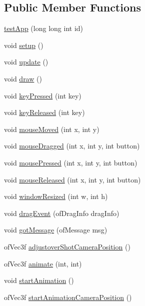 \subsection*{Public Member Functions}
\begin{DoxyCompactItemize}
\item 
\hyperlink{classtest_app_a3d796120bccff4106a3ec028b9a81912}{test\-App} (long long int id)
\item 
void \hyperlink{classtest_app_ad431db15b6150b965cd52bcba8e16e11}{setup} ()
\item 
void \hyperlink{classtest_app_afb39d201aec71a295b7609876bf7d0c6}{update} ()
\item 
void \hyperlink{classtest_app_af869cba67b1dab8481f8d0e216d59dcd}{draw} ()
\item 
void \hyperlink{classtest_app_a904d147c7e532cb92656d5dd4895cd26}{key\-Pressed} (int key)
\item 
void \hyperlink{classtest_app_a1116a10088e4932f6d482efe723cd45e}{key\-Released} (int key)
\item 
void \hyperlink{classtest_app_a33541b19eff9f8285b2487bfc146d58b}{mouse\-Moved} (int x, int y)
\item 
void \hyperlink{classtest_app_a075bcc2be16fd8f3eaa9162fb40a0a1f}{mouse\-Dragged} (int x, int y, int button)
\item 
void \hyperlink{classtest_app_a3f200702ce91859cac2872a39302679d}{mouse\-Pressed} (int x, int y, int button)
\item 
void \hyperlink{classtest_app_aa3680ffc782b1e5c451289817f20c9c6}{mouse\-Released} (int x, int y, int button)
\item 
void \hyperlink{classtest_app_a428b7df9c64352d6e7cb234fc297e6c9}{window\-Resized} (int w, int h)
\item 
void \hyperlink{classtest_app_af15e9e9064fe5ccbe6c82cc401ae9e09}{drag\-Event} (of\-Drag\-Info drag\-Info)
\item 
void \hyperlink{classtest_app_a66dbc8c5c2d4e20febebe9fd42b8c851}{got\-Message} (of\-Message msg)
\item 
of\-Vec3f \hyperlink{classtest_app_a2a792bfdf269fd69951cbf97d4f574af}{adjustover\-Shot\-Camera\-Position} ()
\item 
of\-Vec3f \hyperlink{classtest_app_a1facfe2200dae7ad147b8f9ab31f68c6}{animate} (int, int)
\item 
void \hyperlink{classtest_app_a79467453f6ea0dd63961a810dca9ac6a}{start\-Animation} ()
\item 
of\-Vec3f \hyperlink{classtest_app_a1a97063e992528dc79867e516d9365f0}{start\-Animation\-Camera\-Position} ()

\end{DoxyCompactItemize}
